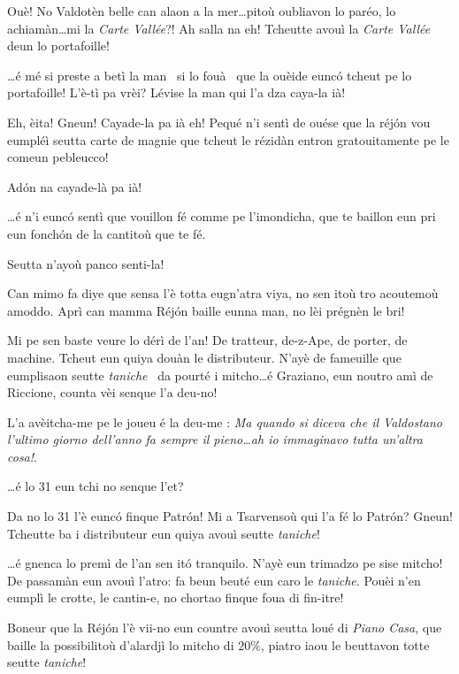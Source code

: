 \begin{drama}
\Laurentspeaks Ouè! No Valdotèn belle can alaon a la mer\ldots pitoù oubliavon lo paréo, lo achiamàn\ldots mi la \textit{Carte Vallée}?! Ah salla na eh! Tcheutte avouì la \textit{Carte Vallée} deun lo portafoille!

\Pierrespeaks \ldots é mé si preste a betì la man \man\ si lo fouà \foua\ que  la ouèide eunc\'o tcheut pe lo portafoille! L'è-tì pa vrèi? Lévise la man qui l'a dza caya-la ià! 

\Laurentspeaks Eh, èita! Gneun! Cayade-la pa ià eh! Pequé n'i sentì de ouése que la réj\'on vou eumpléì seutta carte de magnie que tcheut le rézidàn entron gratouitamente pe le comeun pebleucco!

\Pierrespeaks Ad\'on na cayade-là pa ià!

\Laurentspeaks \ldots é n'i eunc\'o sentì que vouillon fé comme pe l'imondicha, que te baillon eun pri eun fonch\'on de la cantitoù que te fé.

\Pierrespeaks Seutta n'ayoù panco senti-la!

\Laurentspeaks Can mimo fa diye que sensa l'è totta eugn'atra viya, no sen itoù tro acoutemoù amoddo. Aprì can mamma Réj\'on baille eunna man, no lèi prégnèn le bri!

\Pierrespeaks Mi pe sen baste veure lo dérì de l'an! De tratteur, de-z-Ape, de porter, de machine. Tcheut eun quiya douàn le distributeur\distributeur . N'ayè de fameuille que eumplisaon seutte \textit{taniche} \tanica\ da pourté i mitcho\ldots é Graziano, eun noutro amì de Riccione,  counta vèi senque l'a deu-no!

\Laurentspeaks L'a avèitcha-me pe le joueu é la deu-me : \og\textit{Ma quando si diceva che il Valdostano l'ultimo giorno dell'anno fa sempre il pieno\ldots ah io immaginavo tutta un'altra cosa!}\fg.

\Pierrespeaks \ldots é lo 31 eun tchi no senque l'et?

\Laurentspeaks Da no lo 31 l'è eunc\'o finque Patr\'on! Mi a Tsarvensoù qui l'a fé lo Patr\'on? Gneun! Tcheutte ba i distributeur eun quiya avouì seutte \textit{taniche}!

\Pierrespeaks \ldots é gnenca lo premì de l'an sen it\'o tranquilo. N'ayè eun trimadzo pe sise mitcho! De passamàn eun avouì l'a\-tro: fa beun beuté eun caro le \textit{taniche}. Pouèi n'en eumplì le crotte, le cantin-e, no chortao finque foua di fin-itre!

\Laurentspeaks Boneur que la Réj\'on l'è vii-no eun countre avouì seutta loué di \textit{Piano Casa}, que baille la possibilitoù d'alardjì lo mitcho di $20\%$, piatro iaou le beuttavon totte seutte \textit{taniche}!


\end{drama}
